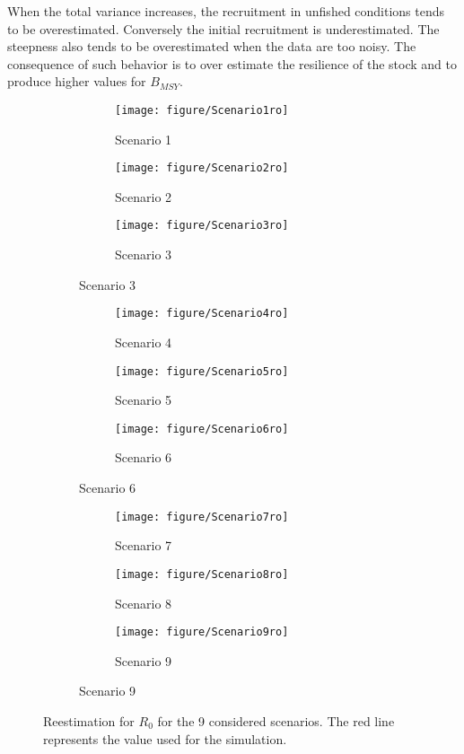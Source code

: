 When the total variance increases, the recruitment in unfished conditions tends to be overestimated. Conversely the initial recruitment is underestimated. The steepness also tends to be overestimated when the data are too noisy.
The consequence of such behavior is to over estimate the resilience of the stock and to produce higher values for $B_{MSY}$.




\begin{figure}
  \begin{subfigure}[b]{\textwidth}
	\begin{subfigure}[b]{0.3\textwidth}
	\texttt{[image: figure/Scenario1ro]}
	\caption{ Scenario 1}
	\end{subfigure}\hfill
	\begin{subfigure}[b]{0.3\textwidth}
	\texttt{[image: figure/Scenario2ro]}
	\caption{ Scenario 2}
	\end{subfigure}
	\begin{subfigure}[b]{0.3\textwidth}
	\texttt{[image: figure/Scenario3ro]}
	\caption{ Scenario 3}
	\end{subfigure}
  \end{subfigure}
  \begin{subfigure}[b]{\textwidth}
	\begin{subfigure}[b]{0.3\textwidth}
	\texttt{[image: figure/Scenario4ro]}
	\caption{ Scenario 4}
	\end{subfigure}\hfill
	\begin{subfigure}[b]{0.3\textwidth}
	\texttt{[image: figure/Scenario5ro]}
	\caption{ Scenario 5}
	\end{subfigure}
	\begin{subfigure}[b]{0.3\textwidth}
	\texttt{[image: figure/Scenario6ro]}
	\caption{ Scenario 6}
	\end{subfigure}
	\end{subfigure}
  \begin{subfigure}[b]{\textwidth}
	\begin{subfigure}[b]{0.3\textwidth}
	\texttt{[image: figure/Scenario7ro]}
	\caption{ Scenario 7}
	\end{subfigure}\hfill
	\begin{subfigure}[b]{0.3\textwidth}
	\texttt{[image: figure/Scenario8ro]}
	\caption{ Scenario 8}
	\end{subfigure}
	\begin{subfigure}[b]{0.3\textwidth}
	\texttt{[image: figure/Scenario9ro]}
	\caption{ Scenario 9}
	\end{subfigure}
  \end{subfigure}
  \caption{Reestimation for $R_0$ for the 9 considered scenarios. The red line represents the value used for the simulation.}
\label{fig:Scenarior0}
\end{figure} 





